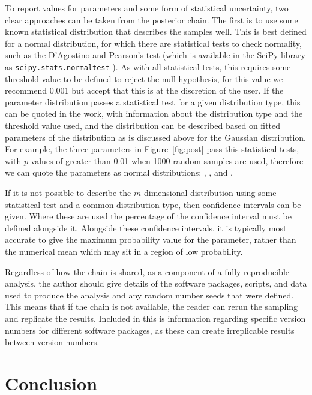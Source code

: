 \documentclass[reprint,superscriptaddress,aps,amsmath,linenumbers]{revtex4-2}
\begin{document}
To report values for parameters and some form of statistical uncertainty, two clear approaches can be taken from the posterior chain. 
The first is to use some known statistical distribution that describes the samples well. 
This is best defined for a normal distribution, for which there are statistical tests to check normality, such as the D'Agostino and Pearson's test \cite{dagostino_omnibus_1971,dagostino_tests_1973} (which is available in the SciPy library as \texttt{scipy.stats.normaltest} \cite{virtanen_scipy_2020}).
As with all statistical tests, this requires some threshold value to be defined to reject the null hypothesis, for this value we recommend \num{0.001} but accept that this is at the discretion of the user. 
If the parameter distribution passes a statistical test for a given distribution type, this can be quoted in the work, with information about the distribution type and the threshold value used, and the distribution can be described based on fitted parameters of the distribution as is discussed above for the Gaussian distribution. 
For example, the three parameters in Figure~\ref{fig:post} pass this statistical tests, with $p$-values of greater than \num{0.01} when \num{1000} random samples are used, therefore we can quote the parameters as normal distributions; \unskip, \unskip, and \unskip.

If it is not possible to describe the $m$-dimensional distribution using some statistical test and a common distribution type, then confidence intervals can be given. 
Where these are used the percentage of the confidence interval must be defined alongside it. 
Alongside these confidence intervals, it is typically most accurate to give the maximum probability value for the parameter, rather than the numerical mean which may sit in a region of low probability.

Regardless of how the chain is shared, as a component of a fully reproducible analysis, the author should give details of the software packages, scripts, and data used to produce the analysis and any random number seeds that were defined. 
This means that if the chain is not available, the reader can rerun the sampling and replicate the results. 
Included in this is information regarding specific version numbers for different software packages, as these can create irreplicable results between version numbers. 

\section{Conclusion}
\label{sec:conclusions}
\end{document}
